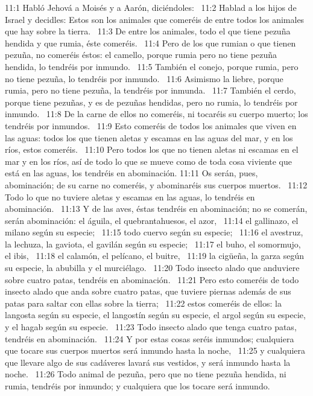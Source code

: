 11:1 Habló Jehová a Moisés y a Aarón, diciéndoles:  
11:2 Hablad a los hijos de Israel y decidles: Estos son los animales que comeréis de entre todos los animales que hay sobre la tierra.  
11:3 De entre los animales, todo el que tiene pezuña hendida y que rumia, éste comeréis.  
11:4 Pero de los que rumian o que tienen pezuña, no comeréis éstos: el camello, porque rumia pero no tiene pezuña hendida, lo tendréis por inmundo.  
11:5 También el conejo, porque rumia, pero no tiene pezuña, lo tendréis por inmundo.  
11:6 Asimismo la liebre, porque rumia, pero no tiene pezuña, la tendréis por inmunda.  
11:7 También el cerdo, porque tiene pezuñas, y es de pezuñas hendidas, pero no rumia, lo tendréis por inmundo.  
11:8 De la carne de ellos no comeréis, ni tocaréis su cuerpo muerto; los tendréis por inmundos.  
11:9 Esto comeréis de todos los animales que viven en las aguas: todos los que tienen aletas y escamas en las aguas del mar, y en los ríos, estos comeréis.  
11:10 Pero todos los que no tienen aletas ni escamas en el mar y en los ríos, así de todo lo que se mueve como de toda cosa viviente que está en las aguas, los tendréis en abominación. 
11:11 Os serán, pues, abominación; de su carne no comeréis, y abominaréis sus cuerpos muertos.  
11:12 Todo lo que no tuviere aletas y escamas en las aguas, lo tendréis en abominación.  
11:13 Y de las aves, éstas tendréis en abominación; no se comerán, serán abominación: el águila, el quebrantahuesos, el azor,  
11:14 el gallinazo, el milano según su especie;  
11:15 todo cuervo según su especie;  
11:16 el avestruz, la lechuza, la gaviota, el gavilán según su especie;  
11:17 el buho, el somormujo, el ibis,  
11:18 el calamón, el pelícano, el buitre,  
11:19 la cigüeña, la garza según su especie, la abubilla y el murciélago.  
11:20 Todo insecto alado que anduviere sobre cuatro patas, tendréis en abominación.  
11:21 Pero esto comeréis de todo insecto alado que anda sobre cuatro patas, que tuviere piernas además de sus patas para saltar con ellas sobre la tierra;  
11:22 estos comeréis de ellos: la langosta según su especie, el langostín según su especie, el argol según su especie, y el hagab según su especie.  
11:23 Todo insecto alado que tenga cuatro patas, tendréis en abominación.  
11:24 Y por estas cosas seréis inmundos; cualquiera que tocare sus cuerpos muertos será inmundo hasta la noche,  
11:25 y cualquiera que llevare algo de sus cadáveres lavará sus vestidos, y será inmundo hasta la noche.  
11:26 Todo animal de pezuña, pero que no tiene pezuña hendida, ni rumia, tendréis por inmundo; y cualquiera que los tocare será inmundo.  
